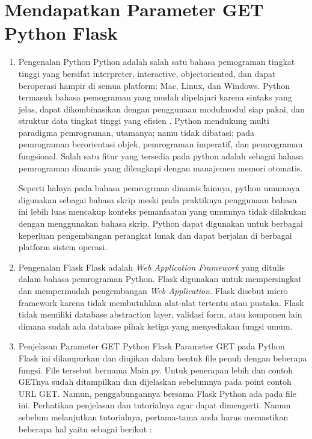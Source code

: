 \begin{enumerate}
\begin{itemize}
  \end{itemize}
\end{enumerate}

\section {Mendapatkan Parameter GET Python Flask}
    \begin{enumerate}
        \item Pengenalan Python
        Python adalah salah satu bahasa pemograman tingkat tinggi yang bersifat interpreter, interactive, objectoriented, dan dapat beroperasi hampir di semua platform: Mac, Linux, dan Windows. Python termasuk bahasa pemograman yang mudah dipelajari karena sintaks yang jelas, dapat dikombinasikan dengan penggunaan modulmodul siap pakai, dan struktur data tingkat tinggi yang efisien \cite{kadir2005dasar}. Python mendukung multi paradigma pemrograman, utamanya; namu tidak dibatasi; pada pemrograman berorientasi objek, pemrograman imperatif, dan pemrograman fungsional. Salah satu fitur yang tersedia pada python adalah sebagai bahasa pemrograman dinamis yang dilengkapi dengan manajemen memori otomatis.

        Seperti halnya pada bahasa pemrogrman dinamis lainnya, python umumnya digunakan sebagai bahasa skrip meski pada praktiknya penggunaan bahasa ini lebih luas mencakup konteks pemanfaatan yang umumnya tidak dilakukan dengan menggunakan bahasa skrip. Python dapat digunakan untuk berbagai keperluan pengembangan perangkat lunak dan dapat berjalan di berbagai platform sistem operasi.

        \item Pengenalan Flask
         Flask adalah \textit{Web Application Framework} yang ditulis dalam bahasa pemrograman Python. Flask digunakan untuk mempersingkat dan mempermudah pengembangan \textit{Web Application}\cite{lokhande2015efficient}. Flask disebut micro framework karena tidak membutuhkan alat-alat tertentu atau pustaka. Flask tidak memiliki database abstraction layer, validasi form, atau komponen lain dimana sudah ada database pihak ketiga yang menyediakan fungsi umum.

        \item Penjelasan Parameter GET Python Flask
        Parameter GET pada Python Flask ini dilampurkan dan diujikan dalam bentuk file penuh dengan beberapa fungsi. File tersebut bernama Main.py. Untuk penerapan lebih dan contoh GETnya sudah ditampilkan dan dijelaskan sebelumnya pada point contoh URL GET. Namun, penggabungannya bersama Flask Python ada pada file ini. Perhatikan penjelasan dan tutorialnya agar dapat dimengerti. Namun sebelum melanjutkan tutorialnya, pertama-tama anda harus memastikan beberapa hal yaitu sebagai berikut :
    \end{enumerate}

